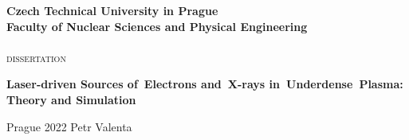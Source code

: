 \documentclass[10pt, a4paper, twoside, openright]{report}
\newcommand{\ctu}{Czech Technical University in Prague}
\newcommand{\fnspe}{Faculty of Nuclear Sciences and Physical Engineering}
\newcommand{\projecttitle}{Laser-driven Sources of~Electrons and~X-rays in~Underdense Plasma: Theory and Simulation}
\begin{document}


\begin{titlepage}









\begin{center}
\begin{spacing}{2.2}
{\Large \bf \ctu} \\
{\Large \bf \fnspe} \\[16mm]
\epsfysize=35mm \\[16mm]
{\huge \textsc{dissertation}}\\[16mm]
\parbox{10cm}
{
\centering
{\Large \bf Laser-driven Sources of~Electrons and~X-rays in~Underdense~Plasma: Theory and Simulation}
}
\end{spacing}
\end{center}



\vfill
{\Large Prague 2022} \hfill {\Large Petr Valenta}

\end{titlepage}
\end{document}

